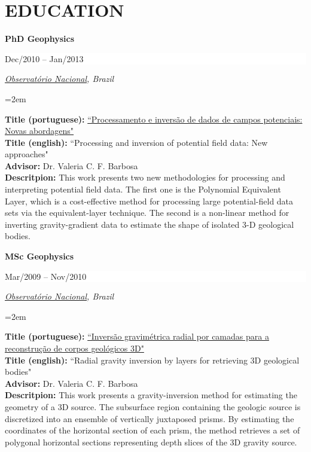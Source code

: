 \documentclass[paper=letter,fontsize=11pt]{scrartcl} %
\newcommand{\sepspace}{\vspace*{1em}}		%
\newcommand{\NewPart}[2]{\section*{\uppercase{#1} #2}}
\newcommand{\EducationEntry}[4]{
		\noindent \textbf{#1} \hfill      %
		\colorbox{White}{%
			\parbox{10em}{%
			\hfill\color{Black}#2}} \par  %
		\noindent \textit{#3} \par        %
		\noindent\hangindent=2em\hangafter=0 \small #4 %
		\normalsize \par}
\begin{document}
\sepspace

\NewPart{Education}{}

\EducationEntry{\Large PhD Geophysics}{\begin{flushright} Dec/2010 -- Jan/2013 \end{flushright} \vspace{-0.2in}}{\href{http://www.on.br/index.php/pt-br/}{Observat\'{o}rio Nacional}, Brazil}

\sepspace \noindent
\textbf{Title (portuguese):} \href{http://www.pinga-lab.org/thesis/oliveira-jr-phd.html}{``Processamento e invers\~{a}o de dados de campos potenciais: Novas abordagens"} \\
\textbf{Title (english):} ``Processing and inversion of potential field data: New approaches" \\
\textbf{Advisor:} Dr. Valeria C. F. Barbosa \\
\textbf{Descritpion:} This work presents two new methodologies for processing and interpreting potential field data. The first one is the Polynomial Equivalent Layer, which is a cost-effective method for processing large potential-field data sets via the equivalent-layer technique. The second is a non-linear method for inverting gravity-gradient data to estimate the shape of isolated 3-D geological bodies.

\sepspace

\EducationEntry{\Large MSc Geophysics}{\begin{flushright} Mar/2009 -- Nov/2010 \end{flushright} \vspace{-0.2in}}{\href{http://www.on.br/index.php/pt-br/}{Observat\'{o}rio Nacional}, Brazil}

\sepspace \noindent
\textbf{Title (portuguese):} \href{http://www.pinga-lab.org/thesis/oliveira-jr-msc.html}{``Invers\~{a}o gravim\'{e}trica radial por camadas para a reconstru\c{c}\~{a}o de corpos geol\'{o}gicos 3D"} \\
\textbf{Title (english):} ``Radial gravity inversion by layers for retrieving 3D geological bodies" \\
\textbf{Advisor:} Dr. Valeria C. F. Barbosa \\
\textbf{Descritpion:} This work presents a gravity-inversion method for estimating the geometry of a 3D source. The subsurface region containing the geologic source is discretized into an ensemble of vertically juxtaposed prisms. By estimating the coordinates of the horizontal section of each prism, the method retrieves a set of polygonal horizontal sections representing depth slices of the 3D gravity source.
\end{document}
